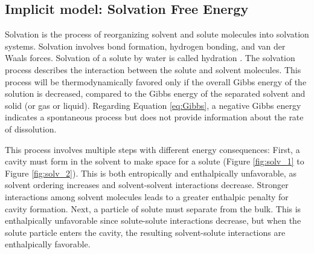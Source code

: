 \subsection{Implicit model: Solvation Free Energy}

Solvation is the process of reorganizing solvent and solute molecules into solvation systems. Solvation involves bond formation, hydrogen bonding, and van der Waals forces. Solvation of a solute by water is called hydration \cite{campbell2006chemistry}. The solvation process describes the interaction between the solute and solvent molecules. This process will be thermodynamically favored only if the overall Gibbs energy of the solution is decreased, compared to the Gibbs energy of the separated solvent and solid (or gas or liquid). Regarding Equation \ref{eq:Gibbs}, a negative Gibbs energy indicates a spontaneous process but does not provide information about the rate of dissolution.

This process involves multiple steps with different energy consequences: First, a cavity must form in the solvent to make space for a solute (Figure \ref{fig:solv_1} to Figure \ref{fig:solv_2}). This is both entropically and enthalpically unfavorable, as solvent ordering increases and solvent-solvent interactions decrease. Stronger interactions among solvent molecules leads to a greater enthalpic penalty for cavity formation. Next, a particle of solute must separate from the bulk. This is enthalpically unfavorable since solute-solute interactions decrease, but when the solute particle enters the cavity, the resulting solvent-solute interactions are enthalpically favorable. 

